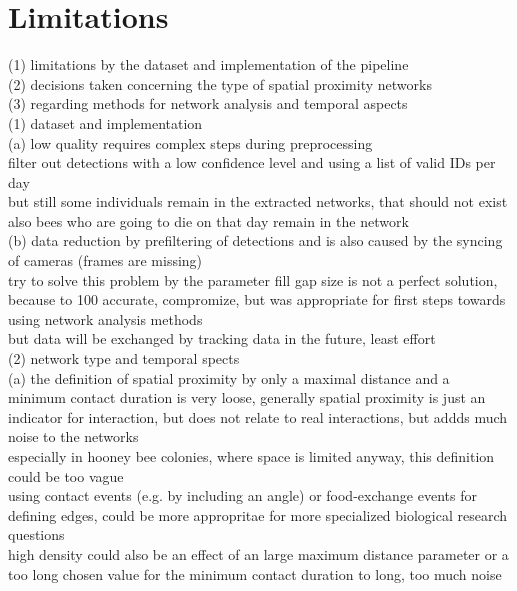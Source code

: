 \section{Limitations}
(1) limitations by the dataset and implementation of the pipeline\\
(2) decisions taken concerning the type of spatial proximity networks\\
(3) regarding methods for network analysis and temporal aspects\\

(1) dataset and implementation\\
(a) low quality requires complex steps during preprocessing\\
filter out detections with a low confidence level and using a list of valid IDs per day\\
but still some individuals remain in the extracted networks, that should not exist\\
also bees who are going to die on that day remain in the network\\
(b) data reduction by prefiltering of detections and is also caused by the syncing of cameras (frames are missing)\\
try to solve this problem by the parameter fill gap size is not a perfect solution, because to 100 accurate, compromize, but was appropriate for first steps towards using network analysis methods\\
but data will be exchanged by tracking data in the future, least effort\\

(2) network type and temporal spects\\
(a) the definition of spatial proximity by only a maximal distance and a minimum contact duration is very loose,
generally spatial proximity is just an indicator for interaction, but does not relate to real interactions, but addds much noise to the networks\\
especially in hooney bee colonies, where space is limited anyway, this definition could be too vague\\
using contact events (e.g. by including an angle) or food-exchange events for defining edges, could be more appropritae for more specialized biological research questions\\
high density could also be an effect of an large maximum distance parameter or a too long chosen value for the minimum contact duration to long, too much noise\\

